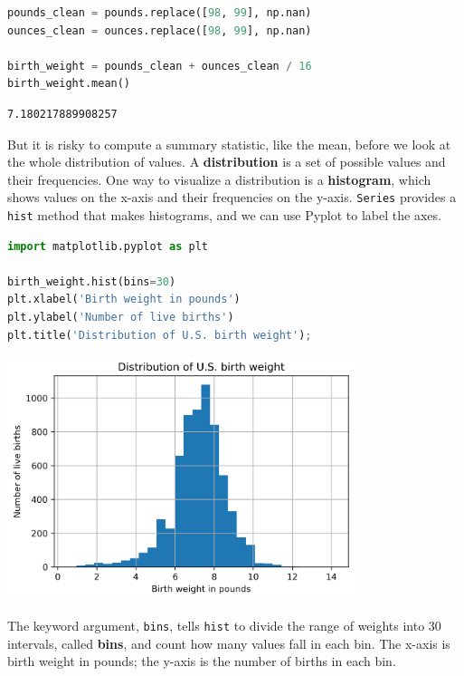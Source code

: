 \begin{lstlisting}[language=Python,style=source]
pounds_clean = pounds.replace([98, 99], np.nan)
ounces_clean = ounces.replace([98, 99], np.nan)

birth_weight = pounds_clean + ounces_clean / 16
birth_weight.mean()
\end{lstlisting}

\begin{lstlisting}[style=output]
7.180217889908257
\end{lstlisting}

But it is risky to compute a summary statistic, like the mean, before we
look at the whole distribution of values. A \textbf{distribution} is a
set of possible values and their frequencies. One way to visualize a
distribution is a \textbf{histogram}, which shows values on the x-axis
and their frequencies on the y-axis. \passthrough{\lstinline!Series!}
provides a \passthrough{\lstinline!hist!} method that makes histograms,
and we can use Pyplot to label the axes.

\begin{lstlisting}[language=Python,style=source]
import matplotlib.pyplot as plt

birth_weight.hist(bins=30)
plt.xlabel('Birth weight in pounds')
plt.ylabel('Number of live births')
plt.title('Distribution of U.S. birth weight');
\end{lstlisting}

\begin{center}
\includegraphics[width=4in]{chapters/07_dataframes_files/07_dataframes_60_0.png}
\end{center}

The keyword argument, \passthrough{\lstinline!bins!}, tells
\passthrough{\lstinline!hist!} to divide the range of weights into 30
intervals, called \textbf{bins}, and count how many values fall in each
bin. The x-axis is birth weight in pounds; the y-axis is the number of
births in each bin.

